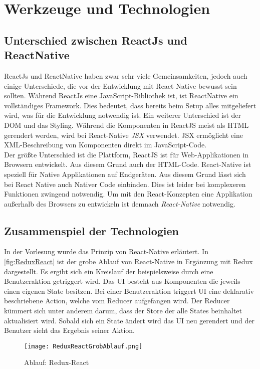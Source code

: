 \section{Werkzeuge und Technologien}
\subsection{Unterschied zwischen ReactJs und ReactNative}
ReactJs und ReactNative haben zwar sehr viele Gemeinsamkeiten, jedoch auch einige Unterschiede, die vor der Entwicklung mit React Native bewusst sein sollten.
Während ReactJs eine JavaScript-Bibliothek ist, ist ReactNative ein vollständiges Framework. Dies bedeutet, dass bereits beim Setup alles mitgeliefert wird, was für die
Entwicklung notwendig ist. Ein weiterer Unterschied ist der DOM und das Styling. Während die Komponenten in ReactJS meist als HTML gerendert werden, wird bei React-Native
\textit{JSX} verwendet. JSX ermöglicht eine XML-Beschreibung von Komponenten direkt im JavaScript-Code.\\
Der größte Unterschied ist die Plattform, ReactJS ist für Web-Applikationen in Browsern entwickelt. Aus diesem Grund auch der HTML-Code. React-Native ist speziell für Native Applikationen auf
Endgeräten. Aus diesem Grund lässt sich bei React Native auch Nativer Code einbinden. Dies ist leider bei komplexeren Funktionen zwingend notwendig. Um mit den React-Konzepten eine Applikation außerhalb des
Browsers zu entwickeln ist demnach \textit{React-Native} notwendig. \cite{ReactJSvsReactNative:online}

\subsection{Zusammenspiel der Technologien}
In der Vorlesung wurde das Prinzip von React-Native erläutert. In \autoref{fig:ReduxReact} ist 
der grobe Ablauf von React-Native in Ergänzung mit Redux dargestellt. Es ergibt sich ein Kreislauf der beispielsweise durch 
eine Benutzeraktion getriggert wird. Das UI besteht aus Komponenten die jeweils einen eigenen State besitzen. Bei einer Benutzeraktion
triggert UI eine deklarativ beschriebene Action, welche vom Reducer aufgefangen wird. 
Der Reducer kümmert sich unter anderem darum, dass der Store der alle States beinhaltet aktualisiert wird. 
Sobald sich ein State ändert wird das UI neu gerendert und der Benutzer sieht das Ergebnis seiner Aktion. 

\begin{figure}[h]
    \centering
    \texttt{[image: ReduxReactGrobAblauf.png]}
    \caption{Ablauf: Redux-React}
    \label{fig:ReduxReact}
\end{figure}


